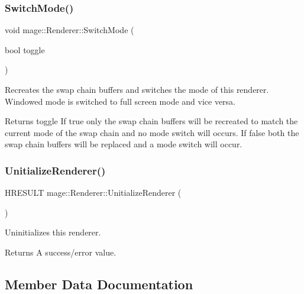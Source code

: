 \subsubsection{\texorpdfstring{Switch\+Mode()}{SwitchMode()}}
{\footnotesize\ttfamily void mage\+::\+Renderer\+::\+Switch\+Mode (\begin{DoxyParamCaption}\item[{bool}]{toggle }\end{DoxyParamCaption})}

Recreates the swap chain buffers and switches the mode of this renderer. Windowed mode is switched to full screen mode and vice versa.

\begin{DoxyReturn}{Returns}
toggle If {\ttfamily true} only the swap chain buffers will be recreated to match the current mode of the swap chain and no mode switch will occurs. If {\ttfamily false} both the swap chain buffers will be replaced and a mode switch will occur. 
\end{DoxyReturn}
\hypertarget{classmage_1_1_renderer_a308beaf67b11128f02e87778b6a9c3c7}{}\label{classmage_1_1_renderer_a308beaf67b11128f02e87778b6a9c3c7} 
\subsubsection{\texorpdfstring{Unitialize\+Renderer()}{UnitializeRenderer()}}
{\footnotesize\ttfamily H\+R\+E\+S\+U\+LT mage\+::\+Renderer\+::\+Unitialize\+Renderer (\begin{DoxyParamCaption}{ }\end{DoxyParamCaption})\hspace{0.3cm}{\ttfamily [protected]}}

Uninitializes this renderer.

\begin{DoxyReturn}{Returns}
A success/error value. 
\end{DoxyReturn}


\subsection{Member Data Documentation}
\hypertarget{classmage_1_1_renderer_a9f7f61e09d9c788ab4d3190bc0fa58d8}{}\label{classmage_1_1_renderer_a9f7f61e09d9c788ab4d3190bc0fa58d8} 
